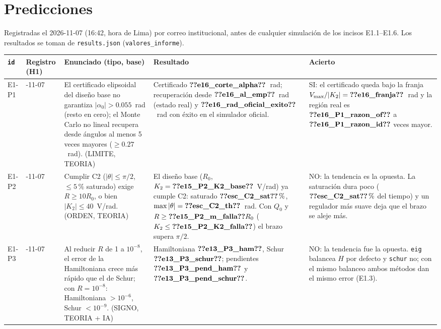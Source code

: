 \section{Predicciones}\label{sec:pred}
Registradas el 2026-11-07 (16:42, hora de Lima) por correo institucional, antes de cualquier
simulación de los incisos E1.1--E1.6. Los resultados se toman de \texttt{results.json} (\texttt{valores\_informe}).

\begin{center}\small
\begin{tabularx}{\linewidth}{@{}>{\raggedright\arraybackslash}p{1.1cm} >{\raggedright\arraybackslash}p{1.9cm} >{\raggedright\arraybackslash}X >{\raggedright\arraybackslash}p{3.3cm} >{\raggedright\arraybackslash}p{3.6cm}@{}}
\toprule
\texttt{id} & Registro (H1) & Enunciado (tipo, base) & Resultado & Acierto \\
\midrule
E1-P1 & 2026-11-07 &
El certificado elipsoidal del diseño base no garantiza $|\alpha_0|>0.055$~rad (resto en cero); el Monte
Carlo no lineal recupera desde ángulos al menos 5 veces mayores ($\ge0.27$~rad). (LIMITE, TEORIA) &
Certificado $\V{e16_corte_alpha}$~rad; recuperación desde $\V{e16_al_emp}$~rad (estado real) y $\V{e16_rad_oficial_exito}$~rad con éxito en el simulador oficial. &
SI: el certificado queda bajo la franja $V_{\max}/|K_2|=\V{e16_franja}$~rad y la región real es $\V{e16_P1_razon_of}$ a $\V{e16_P1_razon_id}$ veces mayor. \\
E1-P2 & 2026-11-07 &
Cumplir C2 ($|\theta|\le\pi/2$, $\le5\,\%$ saturado) exige $R\ge10R_0$, o bien $|K_2|\le40$~V/rad.
(ORDEN, TEORIA) &
El diseño base ($R_0$, $K_2=\V{e15_P2_K2_base}$~V/rad) ya cumple C2: saturado $\V{esc_C2_sat}\,\%$, $\max|\theta|=\V{esc_C2_th}$~rad. Con $Q_0$ y $R\ge\V{e15_P2_m_falla}R_0$ ($K_2\le\V{e15_P2_K2_falla}$) el brazo supera $\pi/2$. &
NO: la tendencia es la opuesta. La saturación dura poco ($\V{esc_C2_sat}\,\%$ del tiempo) y un regulador más suave deja que el brazo se aleje más. \\
E1-P3 & 2026-11-07 &
Al reducir $R$ de 1 a $10^{-8}$, el error de la Hamiltoniana crece más rápido que el de Schur; con
$R=10^{-8}$: Hamiltoniana $>10^{-6}$, Schur $<10^{-9}$. (SIGNO, TEORIA + IA) &
Hamiltoniana $\V{e13_P3_ham}$, Schur $\V{e13_P3_schur}$; pendientes $\V{e13_P3_pend_ham}$ y $\V{e13_P3_pend_schur}$. &
NO: la tendencia fue la opuesta. \texttt{eig} balancea $H$ por defecto y \texttt{schur} no; con el
mismo balanceo ambos métodos dan el mismo error (E1.3). \\
\bottomrule
\end{tabularx}
\end{center}
